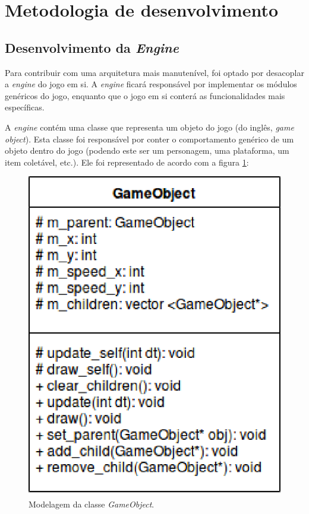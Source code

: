 \section{Metodologia de desenvolvimento} \label{devmet}

  \subsection{Desenvolvimento da \textit{Engine}}

    Para contribuir com uma arquitetura mais manutenível, foi optado por desacoplar a \textit{engine} do jogo em si. A \textit{engine} ficará responsável por implementar os módulos genéricos do jogo, enquanto que o jogo em si conterá as funcionalidades mais específicas.

    A \textit{engine} contém uma classe que representa um objeto do jogo (do inglês, \textit{game object}). Esta classe foi responsável por conter o comportamento genérico de um objeto dentro do jogo (podendo este ser um personagem, uma plataforma, um item coletável, etc.). Ele foi representado de acordo com a figura \ref{game-object}:

    \vspace{\onelineskip}

    \begin{figure}[H]
      \centering \includegraphics[keepaspectratio=true,scale=0.6]{figuras/game-object.eps}
      \caption[Modelagem da classe \textit{GameObject}]
        {Modelagem da classe \textit{GameObject}.}
      \label{game-object}
    \end{figure}

